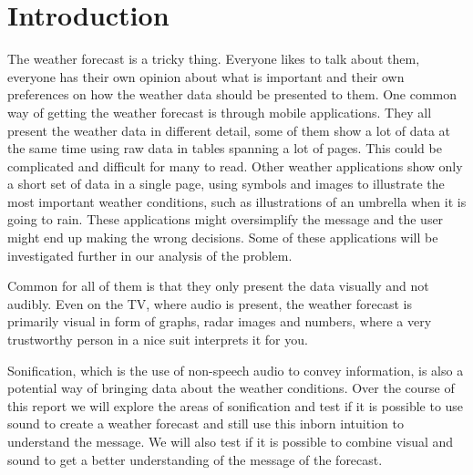
\section{Introduction} %
\label{sec:introduction}

The weather forecast is a tricky thing. 
Everyone likes to talk about them, everyone has their own opinion about what is important and their own preferences on how the weather data should be presented to them. 
One common way of getting the weather forecast is through mobile applications. 
They all present the weather data in different detail, some of them show a lot of data at the same time using raw data in tables spanning a lot of pages. 
This could be complicated and difficult for many to read. 
Other weather applications show only a short set of data in a single page, using symbols and images to illustrate the most important weather conditions, such as illustrations of an umbrella when it is going to rain.
These applications might oversimplify the message and the user might end up making the wrong decisions. 
Some of these applications will be investigated further in our analysis of the problem.

Common for all of them is that they only present the data visually and not audibly. 
Even on the TV, where audio is present, the weather forecast is primarily visual in form of graphs, radar images and numbers, where a very trustworthy person in a nice suit interprets it for you.

Sonification, which is the use of non-speech audio to convey information, is also a potential way of bringing data about the weather conditions. 
Over the course of this report we will explore the areas of sonification and test if it is possible to use sound to create a weather forecast and still use this inborn intuition to understand the message.
We will also test if it is possible to combine visual and sound to get a better understanding of the message of the forecast.



